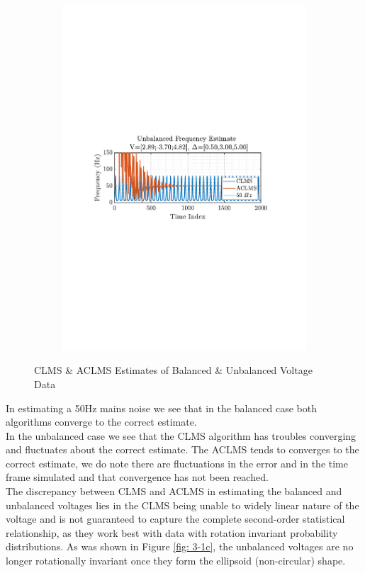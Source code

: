 \documentclass[12pt]{article}
\begin{document}
\begin{figure}[H]
\begin{subfigure}{0.49\textwidth}
					\includegraphics[trim={2.2cm 11.2cm 3.00cm  11.2cm}, clip, width=\textwidth]{../MATLAB/figures/q3_1e_fig04.pdf} 
					\captionsetup{justification=centering}
				\end{subfigure}
				
				\captionsetup{justification=centering}
				\caption{CLMS \& ACLMS Estimates of Balanced \& Unbalanced Voltage Data}
				\label{fig: 3-1e}
			\end{figure}
		
			In estimating a 50Hz mains noise we see that in the balanced case both algorithms converge to the correct estimate. \\
			In the unbalanced case we see that the CLMS algorithm has troubles converging and fluctuates about the correct estimate. The ACLMS tends to converges to the correct estimate, we do note there are fluctuations in the error and in the time frame simulated and that convergence has not been reached.\\
			The discrepancy between CLMS and ACLMS in estimating the balanced and unbalanced voltages lies in the CLMS being unable to widely linear nature of the voltage and is not guaranteed to capture the complete second-order statistical relationship, as they work best with data with rotation invariant probability distributions. As was shown in Figure \ref{fig: 3-1c}, the unbalanced voltages are no longer rotationally invariant once they form the ellipsoid (non-circular) shape.
\end{document}
